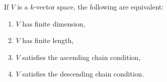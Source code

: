 If $V$ is a $k$-vector space, the following are equivalent:
\begin{enumerate}
	\item $V$ has finite dimension,
	\item $V$ has finite length,
	\item $V$ satisfies the ascending chain condition,
	\item $V$ satisfies the descending chain condition.
\end{enumerate}
